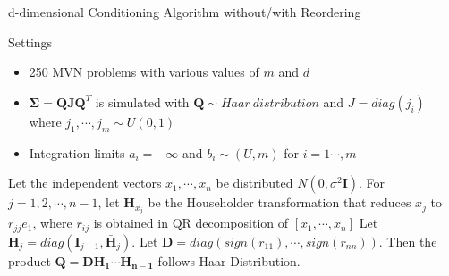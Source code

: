 \begin{frame}{d-dimensional Conditioning Algorithm without/with Reordering}


\begin{block}{Settings}
	\begin{itemize}
		\item 250 MVN problems with various values of $m$ and $d$
		\item $\boldsymbol{\Sigma}=\mathbf{Q}\mathbf{J}\mathbf{Q}^T$ is simulated with $\mathbf{Q}\sim{Haar~distribution}$ and $J=diag(j_i)$ where $j_1,\cdots,j_m\sim U(0,1)$
		\item Integration limits $a_i=-\infty$ and $b_i\sim(U,m)$ for $i=1\cdots,m$
	\end{itemize}
\end{block}

\begin{theorem}\label{thm:haar}\citet{stewart1980efficient}
	Let the independent vectors $x_1,\cdots,x_{n}$ be distributed $N(0,\sigma^2 \mathbf{I})$. For $j=1,2,\cdots,n-1$, let $\mathbf{\bar{H}}_{x_j}$ be the Householder transformation that reduces $x_j$ to $r_{jj}e_1$, where $r_{ij}$ is obtained in QR decomposition of $[x_1,\cdots,x_n]$ Let $\mathbf{H}_j=diag(\mathbf{I}_{j-1},\bar{\mathbf{H}}_j)$. Let $\mathbf{D}=diag(sign(r_{11}), \cdots, sign(r_{nn}))$. Then the product $\mathbf{Q}=\mathbf{DH_1\cdots H_{n-1}}$ follows Haar Distribution.
\end{theorem}

\end{frame}
	
